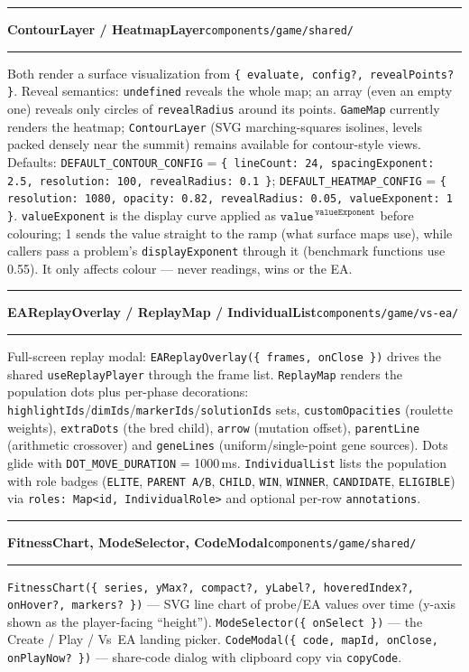 \documentclass[11pt,a4paper]{report}
\newcommand{\srcfile}[1]{\texttt{\small #1}}   %
\newcommand{\ts}[1]{\texttt{#1}}               %
\newenvironment{apientry}[2]{%
  \par\medskip\noindent
  \begin{minipage}{\textwidth}
  \hrule\vspace{0.6ex}
  {\large\ttfamily\bfseries #1}\hfill{\footnotesize\srcfile{#2}}
  \vspace{0.4ex}\hrule\medskip
}{%
  \end{minipage}\par\medskip
}
\begin{document}
\begin{apientry}{ContourLayer / HeatmapLayer}{components/game/shared/}
Both render a surface visualization from
\ts{\{ evaluate, config?, revealPoints? \}}. Reveal semantics:
\ts{undefined} reveals the whole map; an array (even an empty one)
reveals only circles of \ts{revealRadius} around its points. \ts{GameMap}
currently renders the heatmap; \ts{ContourLayer} (SVG marching-squares
isolines, levels packed densely near the summit) remains available for
contour-style views. Defaults: \ts{DEFAULT\_CONTOUR\_CONFIG} =
\ts{\{ lineCount: 24, spacingExponent: 2.5, resolution: 100,
revealRadius: 0.1 \}}; \ts{DEFAULT\_HEATMAP\_CONFIG} =
\ts{\{ resolution: 1080, opacity: 0.82, revealRadius: 0.05,
valueExponent: 1 \}}. \ts{valueExponent} is the display curve applied as
$\ts{value}^{\,\ts{valueExponent}}$ before colouring; 1 sends the value
straight to the ramp (what surface maps use), while callers pass a
problem's \ts{displayExponent} through it (benchmark functions use 0.55).
It only affects colour --- never readings, wins or the EA.
\end{apientry}

\begin{apientry}{EAReplayOverlay / ReplayMap / IndividualList}
{components/game/vs-ea/}
Full-screen replay modal: \ts{EAReplayOverlay(\{ frames, onClose \})}
drives the shared \ts{useReplayPlayer} through the frame list.
\ts{ReplayMap} renders the population dots plus per-phase decorations:
\ts{highlightIds}/\ts{dimIds}/\ts{markerIds}/\ts{solutionIds} sets,
\ts{customOpacities} (roulette weights), \ts{extraDots} (the bred child),
\ts{arrow} (mutation offset), \ts{parentLine} (arithmetic crossover) and
\ts{geneLines} (uniform/single-point gene sources). Dots glide with
\ts{DOT\_MOVE\_DURATION} = 1000\,ms. \ts{IndividualList} lists the
population with role badges (\ts{ELITE}, \ts{PARENT A/B}, \ts{CHILD},
\ts{WIN}, \ts{WINNER}, \ts{CANDIDATE}, \ts{ELIGIBLE}) via
\ts{roles: Map<id, IndividualRole>} and optional per-row
\ts{annotations}.
\end{apientry}

\begin{apientry}{FitnessChart, ModeSelector, CodeModal}{components/game/shared/}
\ts{FitnessChart(\{ series, yMax?, compact?, yLabel?, hoveredIndex?,
onHover?, markers? \})} --- SVG line chart of probe/EA values over time
(y-axis shown as the player-facing ``height'').
\ts{ModeSelector(\{ onSelect \})} --- the Create / Play / Vs~EA landing
picker. \ts{CodeModal(\{ code, mapId, onClose, onPlayNow? \})} ---
share-code dialog with clipboard copy via \ts{copyCode}.
\end{apientry}
\end{document}

